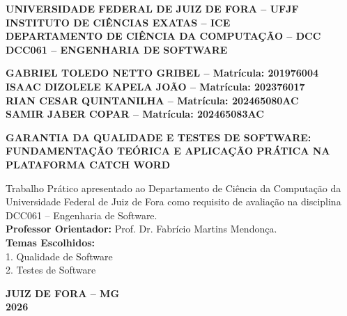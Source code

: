 \documentclass[12pt,a4paper]{article}
\begin{document}
\begin{titlepage}
    \thispagestyle{empty}
    \begin{center}
        \textbf{\MakeUppercase{Universidade Federal de Juiz de Fora -- UFJF}}\\[0.15cm]
        \textbf{\MakeUppercase{Instituto de Ciências Exatas -- ICE}}\\[0.15cm]
        \textbf{\MakeUppercase{Departamento de Ciência da Computação -- DCC}}\\[0.15cm]
        \textbf{\MakeUppercase{DCC061 -- Engenharia de Software}}
        
        \vspace{2.2cm}
        
        \textbf{GABRIEL TOLEDO NETTO GRIBEL -- Matrícula: 201976004}\\[0.15cm]
        \textbf{ISAAC DIZOLELE KAPELA JOÃO -- Matrícula: 202376017}\\[0.15cm]
        \textbf{RIAN CESAR QUINTANILHA -- Matrícula: 202465080AC}\\[0.15cm]
        \textbf{SAMIR JABER COPAR -- Matrícula: 202465083AC}
        
        \vspace{2.5cm}
        
        \textbf{\large\MakeUppercase{Garantia da Qualidade e Testes de Software:}}\\[0.25cm]
        \textbf{\normalsize\MakeUppercase{Fundamentação Teórica e Aplicação Prática na Plataforma Catch Word}}
        
        \vspace{2.0cm}
        
        \begin{flushright}
            \begin{minipage}{0.55\textwidth}
                \footnotesize
                Trabalho Prático apresentado ao Departamento de Ciência da Computação da Universidade Federal de Juiz de Fora como requisito de avaliação na disciplina DCC061 -- Engenharia de Software.\\[0.3cm]
                \textbf{Professor Orientador:} Prof. Dr. Fabrício Martins Mendonça.\\[0.15cm]
                \textbf{Temas Escolhidos:}\\
                1. Qualidade de Software\\
                2. Testes de Software
            \end{minipage}
        \end{flushright}
        
        \vfill
        
        \textbf{JUIZ DE FORA -- MG}\\
        \textbf{2026}
    \end{center}
\end{titlepage}
\end{document}
